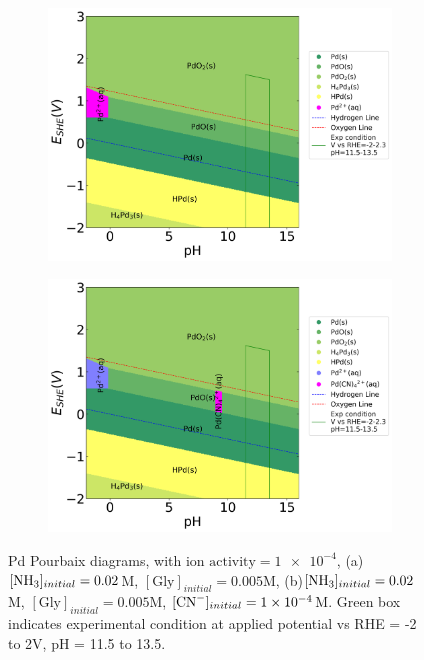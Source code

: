 \documentclass[journal=jacsat,manuscript=article]{achemso}
\begin{document}
\begin{figure}[htbp]
    \centering
    \begin{subfigure}[b]{0.45\textwidth}
        \subcaption{}\label{fig:Pd_Pourbaix_NH3_Gly}
        \includegraphics[width=\textwidth]{Figures/pourbaix_diagrams/Pd-NH3-H2O_activity=1e-04_[NH3]=0.02M_[Gly]=0.005M_[CN]=0.png}
    \end{subfigure}
    \begin{subfigure}[b]{0.45\textwidth}
        \subcaption{}\label{fig:Pd_Pourbaix_NH3_Gly_CN}
        \includegraphics[width=\textwidth]{Figures/pourbaix_diagrams/Pd-NH3-H2O_activity=1e-04_[NH3]=0.02M_[Gly]=0.005M_[CN]=0.0001.png}
    \end{subfigure}

    \caption{Pd Pourbaix diagrams, with $\text{ion activity}=\num{1e-4}$, (a)$[\ce{NH3}]_{initial}= 0.02$M, $[\text{Gly}]_{initial}=0.005$M, (b)$[\ce{NH3}]_{initial}= 0.02$M, $[\text{Gly}]_{initial}=0.005$M,  $[\ce{CN-}]_{initial}=\num{1e-4}$M. Green box indicates experimental condition at applied potential vs RHE = -2 to 2V, pH = 11.5 to 13.5.}
    \label{fig:Pd_Pourbaix}
\end{figure}
\end{document}
